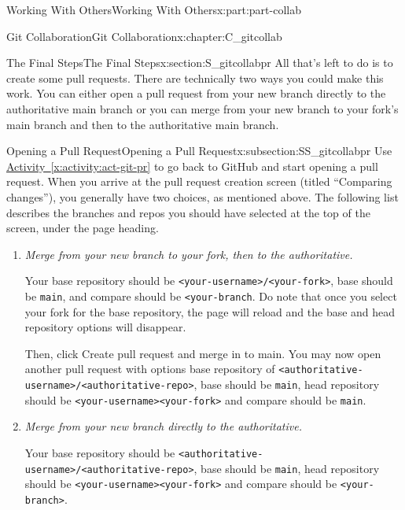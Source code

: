 \documentclass[oneside,10pt,]{book}
\newcommand{\xreffont}{\relax}
\newcommand{\mono}[1]{\texttt{#1}}
\newcommand{\lititle}[1]{{\slshape#1}}
\begin{document}
\begin{partptx}{Working With Others}{}{Working With Others}{}{}{x:part:part-collab}
\begin{chapterptx}{Git Collaboration}{}{Git Collaboration}{}{}{x:chapter:C_gitcollab}
%
\begin{sectionptx}{The Final Steps}{}{The Final Steps}{}{}{x:section:S_gitcollabpr}
All that's left to do is to create some pull requests. There are technically two ways you could make this work. You can either open a pull request from your new branch directly to the authoritative main branch or you can merge from your new branch to your fork's main branch and then to the authoritative main branch.%
%
%
\typeout{************************************************}
\typeout{************************************************}
%
\begin{subsectionptx}{Opening a Pull Request}{}{Opening a Pull Request}{}{}{x:subsection:SS_gitcollabpr}
%
%
%
%
%
%
Use \hyperref[x:activity:act-git-pr]{Activity~{\xreffont\ref{x:activity:act-git-pr}}} to go back to GitHub and start opening a pull request. When you arrive at the pull request creation screen (titled ``Comparing changes''), you generally have two choices, as mentioned above. The following list describes the branches and repos you should have selected at the top of the screen, under the page heading.%
\begin{enumerate}
\item{}\lititle{Merge from your new branch to your fork, then to the authoritative.}\par%
Your base repository should be \mono{<your-username>/<your-fork>}, base should be \mono{main}, and compare should be \mono{<your-branch}. Do note that once you select your fork for the base repository, the page will reload and the base and head repository options will disappear.%
\par
Then, click Create pull request and merge in to main. You may now open another pull request with options base repository of \mono{<authoritative-username>/<authoritative-repo>}, base should be \mono{main}, head repository should be \mono{<your-username><your-fork>} and compare should be \mono{main}.%
\item{}\lititle{Merge from your new branch directly to the authoritative.}\par%
Your base repository should be \mono{<authoritative-username>/<authoritative-repo>}, base should be \mono{main}, head repository should be \mono{<your-username><your-fork>} and compare should be \mono{<your-branch>}.%
\end{enumerate}
%
\par

\end{subsectionptx}
\end{sectionptx}
\end{chapterptx}
\end{partptx}
\end{document}
